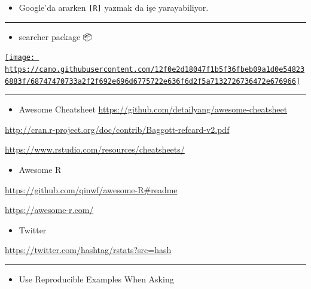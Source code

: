 \documentclass[]{article}
\providecommand{\tightlist}{%
  \setlength{\itemsep}{0pt}\setlength{\parskip}{0pt}}
\begin{document}
\begin{itemize}
\tightlist
\item
  Google'da ararken \texttt{{[}R{]}} yazmak da işe yarayabiliyor.
\end{itemize}

\begin{center}\rule{0.5\linewidth}{\linethickness}\end{center}

\begin{itemize}
\tightlist
\item
  searcher package 📦
\end{itemize}

\href{https://github.com/coatless/searcher}{\texttt{[image: https://camo.githubusercontent.com/12f0e2d18047f1b5f36fbeb09a1d0e548236883f/68747470733a2f2f692e696d6775722e636f6d2f5a7132726736472e676966]}}

\begin{center}\rule{0.5\linewidth}{\linethickness}\end{center}

\begin{itemize}
\tightlist
\item
  Awesome Cheatsheet
  \url{https://github.com/detailyang/awesome-cheatsheet}
\end{itemize}

\url{http://cran.r-project.org/doc/contrib/Baggott-refcard-v2.pdf}

\url{https://www.rstudio.com/resources/cheatsheets/}

\begin{itemize}
\tightlist
\item
  Awesome R
\end{itemize}

\url{https://github.com/qinwf/awesome-R\#readme}

\url{https://awesome-r.com/}

\begin{itemize}
\tightlist
\item
  Twitter
\end{itemize}

\url{https://twitter.com/hashtag/rstats?src=hash}

\begin{center}\rule{0.5\linewidth}{\linethickness}\end{center}

\begin{itemize}
\tightlist
\item
  Use Reproducible Examples When Asking
\end{itemize}
\end{document}
